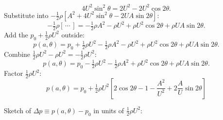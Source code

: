 \documentclass[11pt]{article}
\begin{document}
\[
4U^2\sin^2\theta=2U^2-2U^2\cos 2\theta.
\]
Substitute into $-\tfrac12\rho[A^2+4U^2\sin^2\theta-2UA\sin 2\theta]$:
\[
-\tfrac12\rho[\,\cdots\,]=-\tfrac12\rho A^2-\rho U^2+\rho U^2\cos 2\theta+\rho UA\sin 2\theta.
\]
Add the $p_0+\tfrac12\rho U^2$ outside:
\[
p(a,\theta)=p_0+\tfrac12\rho U^2-\tfrac12\rho A^2-\rho U^2+\rho U^2\cos 2\theta+\rho UA\sin 2\theta.
\]
Combine $\tfrac12\rho U^2-\rho U^2=-\tfrac12\rho U^2$:
\[
p(a,\theta)=p_0-\tfrac12\rho U^2-\tfrac12\rho A^2+\rho U^2\cos 2\theta+\rho UA\sin 2\theta.
\]
Factor $\tfrac12\rho U^2$:
\begin{equation}
\boxed{\;p(a,\theta)=p_0+\tfrac12\rho U^2\!\left[2\cos 2\theta-1-\frac{A^2}{U^2}+2\frac{A}{U}\sin 2\theta\right]\;}
\label{eq:psurf}
\end{equation}

Sketch of $\Delta p\equiv p(a,\theta)-p_0$ in units of $\tfrac12\rho U^2$:
\end{document}
